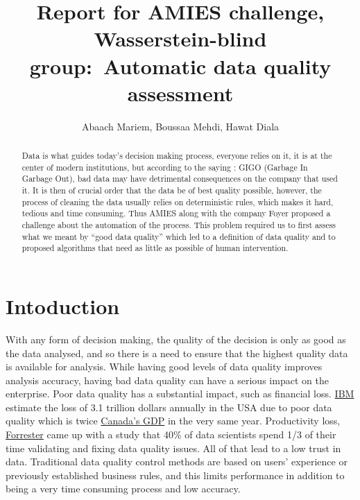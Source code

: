 \documentclass{article}
\title{\Large Report for AMIES challenge, Wasserstein-blind group:\ Automatic data quality assessment}
\author{Abaach Mariem, Boussaa Mehdi, Hawat Diala}
\date{}
\begin{document}
\maketitle

\begin{abstract}
    Data is what guides today's decision making process, everyone relies on it, it is at the center of modern institutions, but according to the saying : GIGO (Garbage In Garbage Out), bad data may have detrimental consequences on the company that used it.  It is then of crucial order that the data be of best quality possible, however, the process of cleaning the data usually relies on deterministic rules, which makes it hard, tedious and time consuming. Thus AMIES along with the company Foyer proposed a challenge about the automation of the process. This problem required us to first assess what we meant by ``good data quality'' which led to a definition of data quality and to proposed algorithms that need as little as possible of human intervention.
\end{abstract}

\section{Intoduction} %
\label{sec:Intoduction}
With any form of decision making, the quality of the decision is only as good as the data analysed, and so there is a need to ensure that the highest quality data is available for analysis. While having good levels of data quality improves analysis accuracy, having bad data quality can have a serious impact on the enterprise.
Poor data quality has a substantial impact, such as financial loss.  \href{https://www.ibm.com/blogs/journey-to-ai/}{IBM} estimate the loss of 3.1 trillion dollars annually  in the USA due to poor data quality which is twice \href{https://data.worldbank.org/indicator/NY.GDP.MKTP.CD}{Canada’s GDP} in the very same year. Productivity loss, \href{https://www.forrester.com/report/Build-Trusted-Data-With-Data-Quality/RES83344}{Forrester} came up with a study that 40\% of data scientists spend 1/3 of their time validating and fixing data quality issues. All of that lead to a low trust in data.
Traditional data quality control methods are based on users’ experience or previously established business rules, and this
limits performance in addition to being a very time consuming process and low accuracy.
\end{document}
